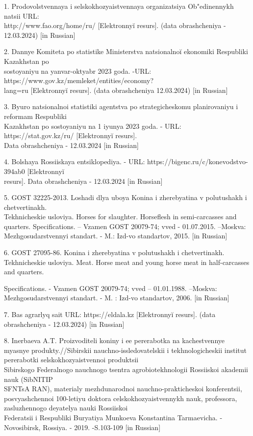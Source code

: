 \begin{noparindent}

1. Prodovol\textquotesingle stvennaya i
sel\textquotesingle skokhozyaistvennaya organizatsiya Ob"edinennykh
natsii URL:\\ http://www.fao.org/home/ru/ {[}Elektronnyĭ resurs{]}. (data
obrashcheniya - 12.03.2024) {[}in Russian{]}

2. Dannye Komiteta po statistike Ministerstva
natsional\textquotesingle noĭ ekonomiki Respubliki Kazakhstan po
\\sostoyaniyu na yanvar\textquotesingle-oktyabr\textquotesingle{} 2023
goda. -URL: https://www.gov.kz/memleket/entities/economy?\\lang=ru
{[}Elektronnyĭ resurs{]}. (data obrashcheniya 12.03.2024) {[}in
Russian{]}

3. Byuro natsional\textquotesingle noi statistiki agentstva po
strategicheskomu planirovaniyu i reformam Respubliki\\ Kazakhstan po
sostoyaniyu na 1 iyunya 2023 goda. - URL: https://stat.gov.kz/ru/
{[}Elektronnyĭ resurs{]}. \\Data obrashcheniya - 12.03.2024 {[}in
Russian{]}

4. Bol\textquotesingle shaya Rossiiskaya entsiklopediya. - URL:
https://bigenc.ru/c/konevodstvo-394ab0 {[}Elektronnyĭ\\ resurs{]}. Data
obrashcheniya - 12.03.2024 {[}in Russian{]}

5. GOST 32225-2013. Loshadi dlya uboya Konina i zherebyatina v
polutushakh i chetvertinakh.\\ Tekhnicheskie usloviya. Horses for
slaughter. Horseflesh in semi-carcasses and quarters. Specifications. --
Vzamen GOST 20079-74; vved - 01.07.2015. --Moskva: Mezhgosudarstvennyi
standart. - M.: Izd-vo standartov, 2015. {[}in Russian{]}

6. GOST 27095-86. Konina i zherebyatina v polutushakh i chetvertinakh.
Tekhnicheskie usloviya. Meat. Horse meat and young horse meat in
half-carcasses and quarters.

Specifications. - Vzamen GOST 20079-74; vved -- 01.01.1988. --Moskva:
Mezhgosudarstvennyi standart. - M. : Izd-vo standartov, 2006. {[}in
Russian{]}

7. Bas agrarlyq sait URL: https://eldala.kz {[}Elektronnyĭ resurs{]}.
(data obrashcheniya - 12.03.2024) {[}in Russian{]}

8. Inerbaeva A.T. Proizvoditeli koniny i ee pererabotka na kachestvennye
myasnye produkty.//Sibirskii nauchno-issledovatel\textquotesingle skii i
tekhnologicheskii institut pererabotki
sel\textquotesingle skokhozyaistvennoi produktsii \\Sibirskogo
Federal\textquotesingle nogo nauchnogo tsentra agrobiotekhnologii
Rossiiskoi akademii nauk (SibNITIP\\ SFNTsA RAN), materialy mezhdunarodnoi
nauchno-prakticheskoi konferentsii, posvyashchennoi 100-letiyu doktora
cel\textquotesingle skokhozyaistvennykh nauk, professora, zasluzhennogo
deyatelya nauki Rossiiskoi \\Federatsii i Respubliki Buryatiya Munkoeva
Konstantina Tarmaevicha. - Novosibirsk, Rossiya. - 2019. -S.103-109
{[}in Russian{]}


\end{noparindent}
